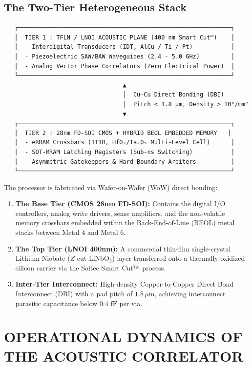 \documentclass[10pt,twocolumn]{article}
\begin{document}
\subsection{The Two-Tier Heterogeneous Stack}

\begin{verbatim}
   ┌─────────────────────────────────────────────────────────────┐
   │  TIER 1 : TFLN / LNOI ACOUSTIC PLANE (400 nm Smart Cut™)    │
   │  - Interdigital Transducers (IDT, AlCu / Ti / Pt)           │
   │  - Piezoelectric SAW/BAW Waveguides (2.4 - 5.0 GHz)         │
   │  - Analog Vector Phase Correlators (Zero Electrical Power)  │
   └─────────────────────────────────────────────────────────────┘
                                  ▲
                                  │  Cu-Cu Direct Bonding (DBI)
                                  │  Pitch < 1.8 µm, Density > 10⁶/mm²
                                  ▼
   ┌─────────────────────────────────────────────────────────────┐
   │  TIER 2 : 28nm FD-SOI CMOS + HYBRID BEOL EMBEDDED MEMORY   │
   │  - eRRAM Crossbars (1T1R, HfO₂/Ta₂O₅ Multi-Level Cell)      │
   │  - SOT-MRAM Latching Registers (Sub-ns Switching)           │
   │  - Asymmetric Gatekeepers & Hard Boundary Arbiters          │
   └─────────────────────────────────────────────────────────────┘
\end{verbatim}

The processor is fabricated via Wafer-on-Wafer (WoW) direct bonding:
\begin{enumerate}
  \item \textbf{The Base Tier (CMOS 28nm FD-SOI):} Contains the digital I/O controllers, analog write drivers, sense amplifiers, and the non-volatile memory crossbars embedded within the Back-End-of-Line (BEOL) metal stacks between Metal 4 and Metal 6.
  \item \textbf{The Top Tier (LNOI 400nm):} A commercial thin-film single-crystal Lithium Niobate ($Z\text{-cut } \text{LiNbO}_3$) layer transferred onto a thermally oxidized silicon carrier via the Soitec Smart Cut™ process.
  \item \textbf{Inter-Tier Interconnect:} High-density Copper-to-Copper Direct Bond Interconnect (DBI) with a pad pitch of $1.8 \, \mu\text{m}$, achieving interconnect parasitic capacitance below $0.4\text{ fF}$ per via.
\end{enumerate}



\section{OPERATIONAL DYNAMICS OF THE ACOUSTIC CORRELATOR}
\end{document}
